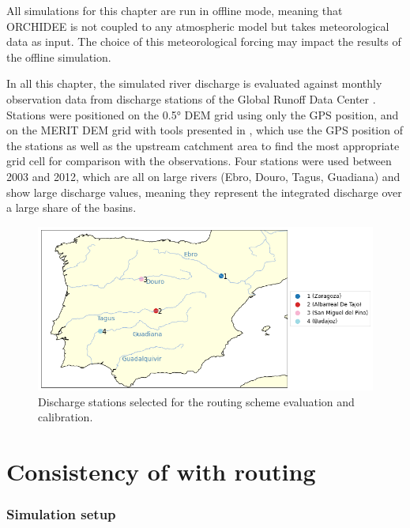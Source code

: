 All simulations for this chapter are run in offline mode, meaning that ORCHIDEE is not coupled to any atmospheric model but takes meteorological data as input. The choice of this meteorological forcing may impact the results of the offline simulation.

In all this chapter, the simulated river discharge is evaluated against monthly observation data from discharge stations of the Global Runoff Data Center \cite[GRDC, https://grdc.bafg.de,][]{fekete_global_2003}.
Stations were positioned on the 0.5° DEM grid using only the GPS position, and on the MERIT DEM grid with tools presented in \cite{polcher_hydrological_2023}, which use the GPS position of the stations as well as the upstream catchment area to find the most appropriate grid cell for comparison with the observations. 
Four stations were used between 2003 and 2012, which are all on large rivers (Ebro, Douro, Tagus, Guadiana) and show large discharge values, meaning they represent the integrated discharge over a large share of the basins. 

\begin{figure}[htbp]
    \centering
    \includegraphics[width=0.7\linewidth]{images/eval_halfdeg/river_discharge/halfdeg_4stations_map.png}
    \caption{Discharge stations selected for the routing scheme evaluation and calibration.}
    \label{fig:halfedg_stations_map}
\end{figure}


\section{Consistency of \native with \std routing}
\subsubsection{Simulation setup}

